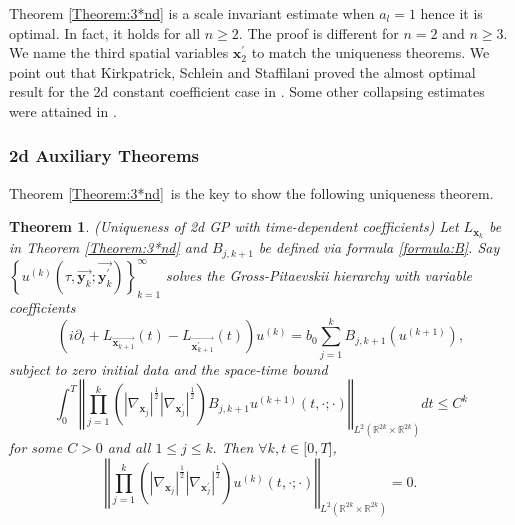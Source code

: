 \documentclass[reqno]{amsart}
\newtheorem{theorem}{Theorem}
\theoremstyle{plain}
\numberwithin{equation}{section}
\begin{document}
Theorem \ref{Theorem:3*nd} is a scale invariant estimate when $a_{l}=1$
hence it is optimal. In fact, it holds for all $n\geqslant 2.$ The proof is
different for $n=2$ and $n\geqslant 3$. We name the third spatial variables $\mathbf{x}_{2}^{\prime }$ to match the uniqueness theorems. We point out
that Kirkpatrick, Schlein and Staffilani proved the almost optimal result
for the 2d constant coefficient case in \cite{Kirpatrick}. Some other
collapsing estimates were attained in \cite{ChenDie, GM}.

\subsubsection{2d Auxiliary Theorems}

Theorem \ref{Theorem:3*nd}\ is the key to show the following uniqueness
theorem.

\begin{theorem}
\label{Theorem:Uniqueness of 2d unknown GP}(Uniqueness of 2d GP with
time-dependent coefficients) Let $L_{\mathbf{x}_{k}}$ be in Theorem \ref{Theorem:3*nd} and $B_{j,k+1}$ be defined via formula \ref{formula:B}. Say $\left\{ u^{(k)}(\tau ,\overrightarrow{\mathbf{y}_{k}};\overrightarrow{\mathbf{y}_{k}^{\prime }})\right\} _{k=1}^{\infty }$ solves the
Gross-Pitaevskii hierarchy with variable coefficients 
\begin{equation*}
\left( i\partial _{t}+L_{\overrightarrow{\mathbf{x}_{k+1}}}(t)-L_{\overrightarrow{\mathbf{x}_{k+1}^{\prime }}}(t)\right)
u^{(k)}=b_{0}\sum_{j=1}^{k}B_{j,k+1}\left( u^{(k+1)}\right) ,
\end{equation*}subject to zero initial data and the space-time bound\begin{equation*}
\int_{0}^{T}\left\Vert \prod_{j=1}^{k}\left( \left\vert \nabla _{\mathbf{x}_{j}}\right\vert ^{\frac{1}{2}}\left\vert \nabla _{\mathbf{x}_{j}^{\prime
}}\right\vert ^{\frac{1}{2}}\right) B_{j,k+1}u^{(k+1)}(t,\mathbf{\cdot };\mathbf{\cdot })\right\Vert _{L^{2}(\mathbb{R}^{2k}\times \mathbb{R}^{2k})}dt\leqslant C^{k}
\end{equation*}for some $C>0$ and all $1\leqslant j\leqslant k.$ Then $\forall k,t\in
\lbrack 0,T]$, 
\begin{equation*}
\left\Vert \prod_{j=1}^{k}\left( \left\vert \nabla _{\mathbf{x}_{j}}\right\vert ^{\frac{1}{2}}\left\vert \nabla _{\mathbf{x}_{j}^{\prime
}}\right\vert ^{\frac{1}{2}}\right) u^{(k)}(t,\mathbf{\cdot };\mathbf{\cdot })\right\Vert _{L^{2}(\mathbb{R}^{2k}\times \mathbb{R}^{2k})}=0.
\end{equation*}
\end{theorem}
\end{document}
